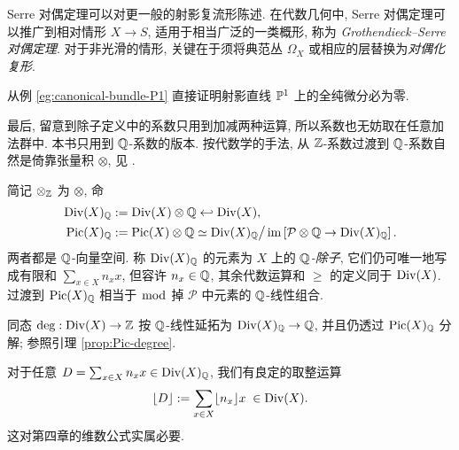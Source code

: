Serre 对偶定理可以对更一般的射影复流形陈述. 在代数几何中, Serre 对偶定理可以推广到相对情形 $X \to S$, 适用于相当广泛的一类概形, 称为 \emph{Grothendieck--Serre 对偶定理}. 对于非光滑的情形, 关键在于须将典范丛 $\Omega_X$ 或相应的层替换为\emph{对偶化复形}.

\begin{exercise}
	从例 \ref{eg:canonical-bundle-P1} 直接证明射影直线 $\mathbb{P}^1$ 上的全纯微分必为零.
\end{exercise}

最后, 留意到除子定义中的系数只用到加减两种运算, 所以系数也无妨取在任意加法群中. 本书只用到 $\mathbb{Q}$-系数的版本. 按代数学的手法, 从 $\mathbb{Z}$-系数过渡到 $\mathbb{Q}$-系数自然是倚靠张量积 $\otimes$, 见 \cite[\S 6.6]{Li1}.

\begin{definition}   
	简记 $\otimes_{\mathbb{Z}}$ 为 $\otimes$, 命
	\begin{align*}
		\operatorname{Div}(X)_{\mathbb{Q}} & := \operatorname{Div}(X) \otimes \mathbb{Q} \hookleftarrow \operatorname{Div}(X), \\
		\operatorname{Pic}(X)_{\mathbb{Q}} & := \operatorname{Pic}(X) \otimes \mathbb{Q} \simeq \operatorname{Div}(X)_{\mathbb{Q}} \big/ \operatorname{im}\left[ \mathcal{P} \otimes \mathbb{Q} \to \operatorname{Div}(X)_{\mathbb{Q}} \right].
	\end{align*}
	两者都是 $\mathbb{Q}$-向量空间. 称 $\operatorname{Div}(X)_{\mathbb{Q}}$ 的元素为 $X$ 上的 \emph{$\mathbb{Q}$-除子}, 它们仍可唯一地写成有限和 $\sum_{x \in X} n_x x$, 但容许 $n_x \in \mathbb{Q}$, 其余代数运算和 $\geq$ 的定义同于 $\operatorname{Div}(X)$. 过渡到 $\operatorname{Pic}(X)_{\mathbb{Q}}$ 相当于 $\bmod$ 掉 $\mathcal{P}$ 中元素的 $\mathbb{Q}$-线性组合.
\end{definition}

同态 $\deg: \operatorname{Div}(X) \to \mathbb{Z}$ 按 $\mathbb{Q}$-线性延拓为 $\operatorname{Div}(X)_{\mathbb{Q}} \to \mathbb{Q}$, 并且仍透过 $\operatorname{Pic}(X)_{\mathbb{Q}}$ 分解; 参照引理 \ref{prop:Pic-degree}.

对于任意 $D = \sum_{x \in X} n_x x \in \operatorname{Div}(X)_{\mathbb{Q}}$, 我们有良定的取整运算 
\[ \lfloor D \rfloor := \sum_{x \in X} \lfloor n_x \rfloor x \; \in \operatorname{Div}(X). \]
这对第四章的维数公式实属必要.
